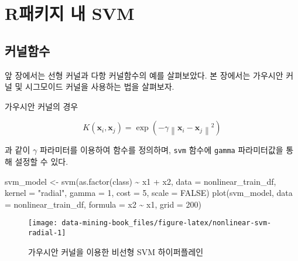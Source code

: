 \documentclass[
]{book}
\newenvironment{Shaded}{\begin{snugshade}}{\end{snugshade}}
\newcommand{\AttributeTok}[1]{\textcolor[rgb]{0.77,0.63,0.00}{#1}}
\newcommand{\ConstantTok}[1]{\textcolor[rgb]{0.00,0.00,0.00}{#1}}
\newcommand{\DecValTok}[1]{\textcolor[rgb]{0.00,0.00,0.81}{#1}}
\newcommand{\FunctionTok}[1]{\textcolor[rgb]{0.00,0.00,0.00}{#1}}
\newcommand{\NormalTok}[1]{#1}
\newcommand{\OtherTok}[1]{\textcolor[rgb]{0.56,0.35,0.01}{#1}}
\newcommand{\SpecialCharTok}[1]{\textcolor[rgb]{0.00,0.00,0.00}{#1}}
\newcommand{\StringTok}[1]{\textcolor[rgb]{0.31,0.60,0.02}{#1}}
\begin{document}
\hypertarget{svm-r-pkg}{%
\section{R패키지 내 SVM}\label{svm-r-pkg}}

\hypertarget{svm-kernel-function}{%
\subsection{커널함수}\label{svm-kernel-function}}

앞 장에서는 선형 커널과 다항 커널함수의 예를 살펴보았다. 본 장에서는 가우시안 커널 및 시그모이드 커널을 사용하는 법을 살펴보자.

가우시안 커널의 경우

\begin{equation*}
K(\mathbf{x}_i, \mathbf{x}_j) = \exp \left( -\gamma \left\lVert \mathbf{x}_i - \mathbf{x}_j \right\rVert^2 \right)
\end{equation*}

과 같이 \(\gamma\) 파라미터를 이용하여 함수를 정의하며, \texttt{svm} 함수에 \texttt{gamma} 파라미터값을 통해 설정할 수 있다.

\begin{Shaded}
\begin{Highlighting}[]
\NormalTok{svm\_model }\OtherTok{\textless{}{-}} \FunctionTok{svm}\NormalTok{(}\FunctionTok{as.factor}\NormalTok{(class) }\SpecialCharTok{\textasciitilde{}}\NormalTok{ x1 }\SpecialCharTok{+}\NormalTok{ x2, }\AttributeTok{data =}\NormalTok{ nonlinear\_train\_df, }
                 \AttributeTok{kernel =} \StringTok{"radial"}\NormalTok{, }\AttributeTok{gamma =} \DecValTok{1}\NormalTok{,}
                 \AttributeTok{cost =} \DecValTok{5}\NormalTok{, }\AttributeTok{scale =} \ConstantTok{FALSE}\NormalTok{)}
\FunctionTok{plot}\NormalTok{(svm\_model, }\AttributeTok{data =}\NormalTok{ nonlinear\_train\_df, }\AttributeTok{formula =}\NormalTok{ x2 }\SpecialCharTok{\textasciitilde{}}\NormalTok{ x1, }\AttributeTok{grid =} \DecValTok{200}\NormalTok{)}
\end{Highlighting}
\end{Shaded}

\begin{figure}

{\centering \texttt{[image: data-mining-book\_files/figure-latex/nonlinear-svm-radial-1]} 

}

\caption{가우시안 커널을 이용한 비선형 SVM 하이퍼플레인}\label{fig:nonlinear-svm-radial}
\end{figure}
\end{document}

